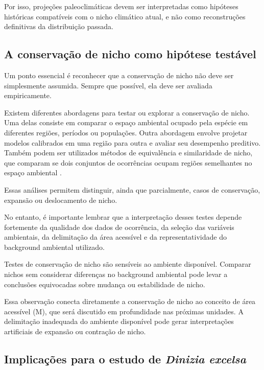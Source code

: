 Por isso, projeções paleoclimáticas devem ser interpretadas como hipóteses históricas compatíveis com o nicho climático atual, e não como reconstruções definitivas da distribuição passada.

\subsection{A conservação de nicho como hipótese testável}

Um ponto essencial é reconhecer que a conservação de nicho não deve ser simplesmente assumida. Sempre que possível, ela deve ser avaliada empiricamente.

Existem diferentes abordagens para testar ou explorar a conservação de nicho. Uma delas consiste em comparar o espaço ambiental ocupado pela espécie em diferentes regiões, períodos ou populações. Outra abordagem envolve projetar modelos calibrados em uma região para outra e avaliar seu desempenho preditivo. Também podem ser utilizados métodos de equivalência e similaridade de nicho, que comparam se dois conjuntos de ocorrências ocupam regiões semelhantes no espaço ambiental \parencite{broennimann2012,warren2008}.

Essas análises permitem distinguir, ainda que parcialmente, casos de conservação, expansão ou deslocamento de nicho.

No entanto, é importante lembrar que a interpretação desses testes depende fortemente da qualidade dos dados de ocorrência, da seleção das variáveis ambientais, da delimitação da área acessível e da representatividade do background ambiental utilizado.

\begin{atencao}
	Testes de conservação de nicho são sensíveis ao ambiente disponível. Comparar nichos sem considerar diferenças no background ambiental pode levar a conclusões equivocadas sobre mudança ou estabilidade de nicho.
\end{atencao}

Essa observação conecta diretamente a conservação de nicho ao conceito de área acessível (M), que será discutido em profundidade nas próximas unidades. A delimitação inadequada do ambiente disponível pode gerar interpretações artificiais de expansão ou contração de nicho.

\subsection{Implicações para o estudo de \textit{Dinizia excelsa}}


